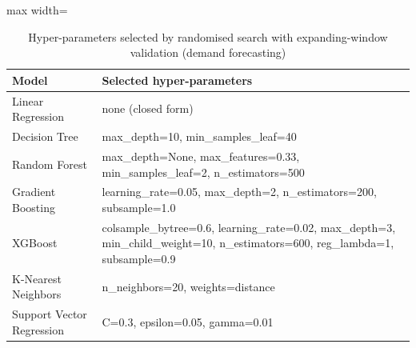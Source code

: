 \begin{table}[htbp]
\centering
\footnotesize
\caption{Hyper-parameters selected by randomised search with expanding-window validation (demand forecasting)}
\label{tab:hyper}
\begin{adjustbox}{max width=\linewidth}
\begin{tabular}{l>{\raggedright\arraybackslash}p{10cm}}
\toprule
\textbf{Model} & \textbf{Selected hyper-parameters} \\
\midrule
Linear Regression & none (closed form) \\
Decision Tree & max\_depth=10, min\_samples\_leaf=40 \\
Random Forest & max\_depth=None, max\_features=0.33, min\_samples\_leaf=2, n\_estimators=500 \\
Gradient Boosting & learning\_rate=0.05, max\_depth=2, n\_estimators=200, subsample=1.0 \\
XGBoost & colsample\_bytree=0.6, learning\_rate=0.02, max\_depth=3, min\_child\_weight=10, n\_estimators=600, reg\_lambda=1, subsample=0.9 \\
K-Nearest Neighbors & n\_neighbors=20, weights=distance \\
Support Vector Regression & C=0.3, epsilon=0.05, gamma=0.01 \\
\bottomrule
\end{tabular}
\end{adjustbox}
\end{table}
